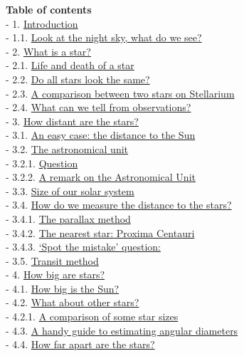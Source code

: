 \documentclass[
  letterpaper,
  DIV=11,
  numbers=noendperiod]{scrartcl}
\begin{document}
\textbf{Table of contents}\\
- 1. \protect\hyperlink{toc1_}{Introduction}\\
- 1.1. \protect\hyperlink{toc1_1_}{Look at the night sky, what do we
see?}\\
- 2. \protect\hyperlink{toc2_}{What is a star?}\\
- 2.1. \protect\hyperlink{toc2_1_}{Life and death of a star}\\
- 2.2. \protect\hyperlink{toc2_2_}{Do all stars look the same?}\\
- 2.3. \protect\hyperlink{toc2_3_}{A comparison between two stars on
Stellarium}\\
- 2.4. \protect\hyperlink{toc2_4_}{What can we tell from
observations?}\\
- 3. \protect\hyperlink{toc3_}{How distant are the stars?}\\
- 3.1. \protect\hyperlink{toc3_1_}{An easy case: the distance to the
Sun}\\
- 3.2. \protect\hyperlink{toc3_2_}{The astronomical unit}\\
- 3.2.1. \protect\hyperlink{toc3_2_1_}{Question}\\
- 3.2.2. \protect\hyperlink{toc3_2_2_}{A remark on the Astronomical
Unit}\\
- 3.3. \protect\hyperlink{toc3_3_}{Size of our solar system}\\
- 3.4. \protect\hyperlink{toc3_4_}{How do we measure the distance to the
stars?}\\
- 3.4.1. \protect\hyperlink{toc3_4_1_}{The parallax method}\\
- 3.4.2. \protect\hyperlink{toc3_4_2_}{The nearest star: Proxima
Centauri}\\
- 3.4.3. \protect\hyperlink{toc3_4_3_}{`Spot the mistake' question:}\\
- 3.5. \protect\hyperlink{toc3_5_}{Transit method}\\
- 4. \protect\hyperlink{toc4_}{How big are stars?}\\
- 4.1. \protect\hyperlink{toc4_1_}{How big is the Sun?}\\
- 4.2. \protect\hyperlink{toc4_2_}{What about other stars?}\\
- 4.2.1. \protect\hyperlink{toc4_2_1_}{A comparison of some star
sizes}\\
- 4.3. \protect\hyperlink{toc4_3_}{A handy guide to estimating angular
diameters}\\
- 4.4. \protect\hyperlink{toc4_4_}{How far apart are the stars?}\\
\end{document}

